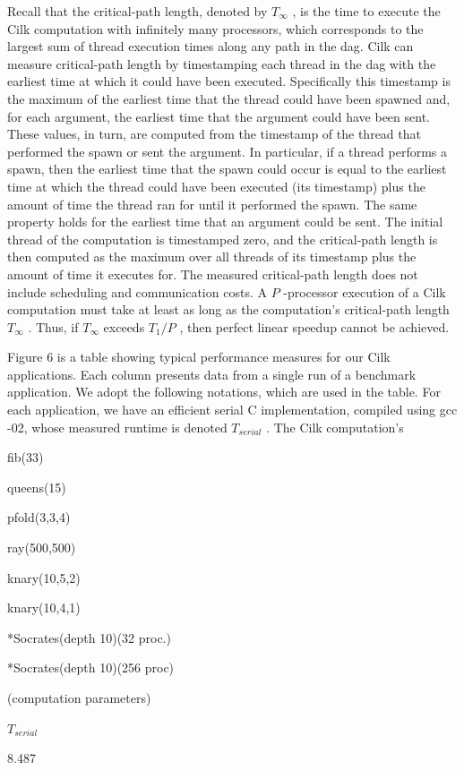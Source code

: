 \documentclass[
]{article}
\begin{document}
Recall that the critical-path length, denoted by \(T_{\infty}\) , is the
time to execute the Cilk computation with infinitely many processors,
which corresponds to the largest sum of thread execution times along any
path in the dag. Cilk can measure critical-path length by timestamping
each thread in the dag with the earliest time at which it could have
been executed. Specifically this timestamp is the maximum of the
earliest time that the thread could have been spawned and, for each
argument, the earliest time that the argument could have been sent.
These values, in turn, are computed from the timestamp of the thread
that performed the spawn or sent the argument. In particular, if a
thread performs a spawn, then the earliest time that the spawn could
occur is equal to the earliest time at which the thread could have been
executed (its timestamp) plus the amount of time the thread ran for
until it performed the spawn. The same property holds for the earliest
time that an argument could be sent. The initial thread of the
computation is timestamped zero, and the critical-path length is then
computed as the maximum over all threads of its timestamp plus the
amount of time it executes for. The measured critical-path length does
not include scheduling and communication costs. A \(P\) -processor
execution of a Cilk computation must take at least as long as the
computation's critical-path length \(T_{\infty}\) . Thus, if
\(T_{\infty}\) exceeds \(T_{1}/P\) , then perfect linear speedup cannot
be achieved.

Figure 6 is a table showing typical performance measures for our Cilk
applications. Each column presents data from a single run of a benchmark
application. We adopt the following notations, which are used in the
table. For each application, we have an efficient serial C
implementation, compiled using gcc -02, whose measured runtime is
denoted \(T_{serial}\) . The Cilk computation's

fib(33)

queens(15)

pfold(3,3,4)

ray(500,500)

knary(10,5,2)

knary(10,4,1)

*Socrates(depth 10)(32 proc.)

*Socrates(depth 10)(256 proc)

(computation parameters)

\(T_{serial}\)

8.487
\end{document}
